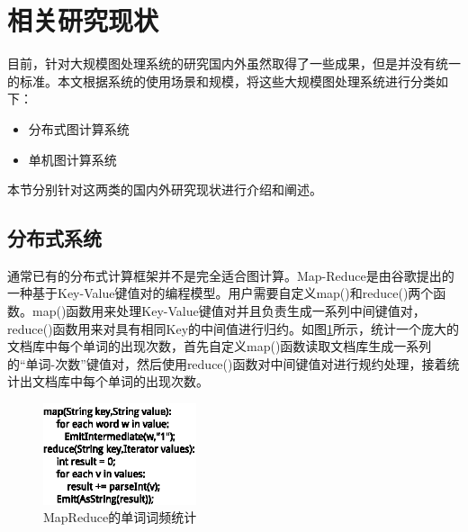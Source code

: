 
\section{相关研究现状}

目前，针对大规模图处理系统的研究国内外虽然取得了一些成果，但是并没有统一的标准。本文根据系统的使用场景和规模，将这些大规模图处理系统进行分类如下：

\begin{itemize}
\item 分布式图计算系统
\item 单机图计算系统
\end{itemize}

本节分别针对这两类的国内外研究现状进行介绍和阐述。

\subsection{分布式系统}

通常已有的分布式计算框架并不是完全适合图计算。Map-Reduce\cite{lammel2008google,dean2008mapreduce}是由谷歌提出的一种基于Key-Value键值对的编程模型。用户需要自定义map()和reduce()两个函数。map()函数用来处理Key-Value键值对并且负责生成一系列中间键值对，reduce()函数用来对具有相同Key的中间值进行归约。如图\ref{fig:mp}所示，统计一个庞大的文档库中每个单词的出现次数，首先自定义map()函数读取文档库生成一系列的“单词-次数”键值对，然后使用reduce()函数对中间键值对进行规约处理，接着统计出文档库中每个单词的出现次数。
\begin{figure}[htbp]
\centering
\includegraphics[width=0.4\textwidth]{myfigures/mapreduce.eps}
\caption{MapReduce的单词词频统计}\label{fig:mp}
\end{figure}

